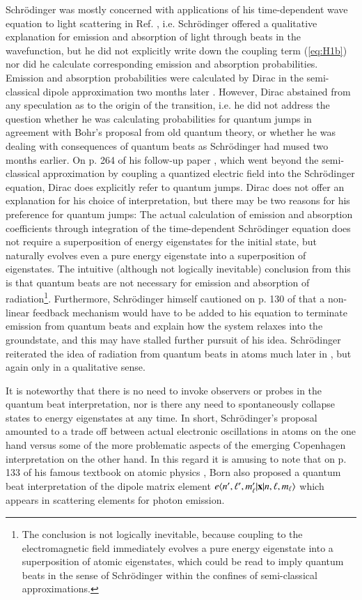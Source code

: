 \documentclass[final,3p,12pt]{elsarticle3}
\begin{document}
Schr\"odinger was mostly concerned with applications of his time-dependent wave 
equation to light scattering in Ref. \cite{erwin}, i.e. Schr\"odinger offered a 
qualitative explanation for emission and absorption of light through beats in the 
wavefunction, but he did not explicitly write down the coupling term (\ref{eq:H1b})
nor did he calculate corresponding emission and absorption probabilities.
Emission and absorption probabilities were calculated by Dirac in the semi-classical 
dipole approximation two months later \cite{dirac1a}. However, Dirac abstained from 
any speculation as to the origin of the transition, i.e. he did not address the
question whether he was calculating 
probabilities for quantum jumps in agreement with Bohr's proposal from old quantum 
theory, or whether he was dealing with consequences of quantum beats as Schr\"odinger 
had mused two months earlier. On p. 264 of his follow-up paper \cite{dirac1b}, which 
went beyond the semi-classical approximation by coupling a quantized electric field 
into the Schr\"odinger equation, Dirac does explicitly refer to quantum jumps. 
Dirac does not offer an explanation for his choice of interpretation, but there may 
be two reasons for his preference for quantum jumps: The actual calculation of 
emission and absorption coefficients through integration of the time-dependent 
Schr\"odinger equation does not require a superposition of energy eigenstates for 
the initial state, but naturally evolves even a pure energy eigenstate into a 
superposition of eigenstates. The intuitive (although not logically inevitable) 
conclusion from this is that quantum beats are not necessary for emission and 
absorption of radiation\footnote{The conclusion is not logically inevitable, because 
coupling to the electromagnetic field immediately evolves a pure energy eigenstate 
into a superposition of atomic eigenstates, which could be read to imply quantum 
beats in the sense of Schr\"odinger within the confines of semi-classical 
approximations.}. Furthermore, Schr\"odinger himself cautioned on p. 130 
of \cite{erwin} that a non-linear feedback mechanism would have to be added to his 
equation to terminate emission from quantum beats and explain how the system relaxes 
into the groundstate, and this may have stalled further pursuit of his idea. 
Schr\"odinger reiterated the idea of radiation from quantum beats in atoms much later 
in \cite{erwin2,erwin3}, but again only in a qualitative sense.

It is noteworthy that there is no need to invoke observers or probes in the quantum 
beat interpretation, nor is there any need to spontaneously collapse states to energy 
eigenstates at any time. In short, Schr\"odinger's proposal amounted to a trade off 
between actual electronic oscillations in atoms on the one hand versus some of the 
more problematic aspects of the emerging Copenhagen interpretation on the other hand. 
In this regard it is amusing to note that on p. 133 of his famous textbook on atomic 
physics \cite{born}, Born also proposed a quantum beat interpretation of the dipole 
matrix element $e\langle n',\ell',m'_\ell|\mathrm{\bf x}|n,\ell,m_\ell\rangle$ which appears
in scattering elements for photon emission.
\end{document}
